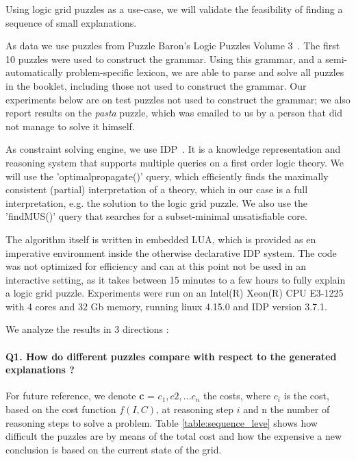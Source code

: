 Using logic grid puzzles as a use-case, we will validate the feasibility of finding a sequence of small explanations.

As data we use puzzles from Puzzle Baron’s Logic Puzzles Volume 3~\cite{logigrammen}. The first 10 puzzles were used to construct the grammar. Using this grammar, and a semi-automatically problem-specific lexicon, we are able to parse and solve all puzzles in the booklet, including those not used to construct the grammar. Our experiments below are on test puzzles not used to construct the grammar; we also report results on the \textit{pasta} puzzle, which was emailed to us by a person that did not manage to solve it himself.

As constraint solving engine, we use IDP~\cite{idp}. It is a knowledge representation and reasoning system that supports multiple queries on a first order logic theory. We will use the 'optimalpropagate()' query, which efficiently finds the maximally consistent (partial) interpretation of a theory, which in our case is a full interpretation, e.g. the solution to the logic grid puzzle. We also use the 'findMUS()' query that searches for a subset-minimal unsatisfiable core.

The algorithm itself is written in embedded LUA, which is provided as en imperative environment inside the otherwise declarative IDP system. The code was not optimized for efficiency and can at this point not be used in an interactive setting, as it takes between 15 minutes to a few hours to fully explain a logic grid puzzle. Experiments were run on an Intel(R) Xeon(R) CPU E3-1225 with 4 cores and 32 Gb memory, running linux 4.15.0 and IDP version 3.7.1.


We analyze the results in 3 directions :

\paragraph{Q1. How do different puzzles compare with respect to the generated explanations ?} For future reference, we denote \textbf{c} = $c_1, c2, ...c_n$ the costs, where $c_i$ is the cost, based on the cost function $f(I, C)$, at reasoning step $i$ and n the number of reasoning steps to solve a problem. Table \ref{table:sequence_leve} shows how difficult the puzzles are by means of the total cost and how the expensive a new conclusion is based on the current state of the grid.


